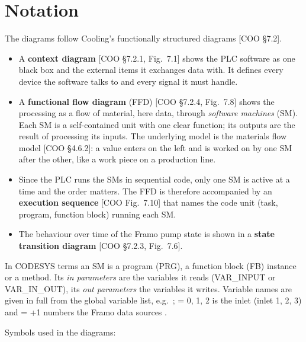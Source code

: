 \documentclass[11pt]{article}
\begin{document}
\section{Notation}
\label{sec:notation}

The diagrams follow Cooling's functionally structured diagrams [COO \S7.2].
\begin{itemize}
  \item A \textbf{context diagram} [COO \S7.2.1, Fig.~7.1] shows the PLC software as one black
        box and the external items it exchanges data with. It defines every device the software
        talks to and every signal it must handle.
  \item A \textbf{functional flow diagram} (FFD) [COO \S7.2.4, Fig.~7.8] shows the processing as a
        flow of material, here data, through \emph{software machines} (SM). Each SM is a
        self-contained unit with one clear function; its outputs are the result of processing its
        inputs. The underlying model is the materials flow model [COO \S4.6.2]: a value enters on
        the left and is worked on by one SM after the other, like a work piece on a production
        line.
  \item Since the PLC runs the SMs in sequential code, only one SM is active at a time and the
        order matters. The FFD is therefore accompanied by an \textbf{execution sequence}
        [COO Fig.~7.10] that names the code unit (task, program, function block) running each SM.
  \item The behaviour over time of the Framo pump state is shown in a \textbf{state transition
        diagram} [COO \S7.2.3, Fig.~7.6].
\end{itemize}

In CODESYS terms an SM is a program (PRG), a function block (FB) instance or a method. Its
\emph{in parameters} are the variables it reads (VAR\_INPUT or VAR\_IN\_OUT), its \emph{out
parameters} the variables it writes. Variable names are given in full from the global variable
list, e.g.\ ;  = 0, 1, 2 is the inlet (inlet 1, 2, 3)
and  = +1 numbers the Framo data sources .

Symbols used in the diagrams:

\begin{center}
\end{center}
\end{document}

